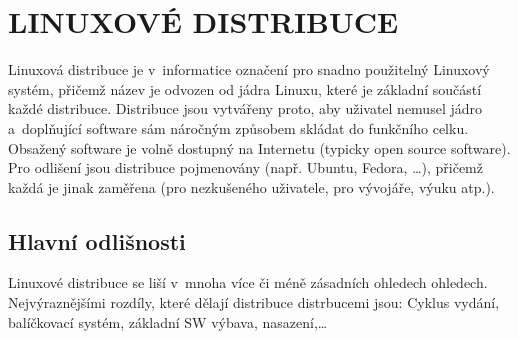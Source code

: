 \documentclass[a4paper,12pt]{article}
\newcommand{\sectionV}[1]{\section{\uppercase{#1}}}	%
\begin{document}
\sectionV{Linuxové distribuce}
Linuxová distribuce je v~informatice označení pro snadno použitelný Linuxový systém, přičemž název je odvozen od jádra Linuxu, které je základní součástí každé distribuce. Distribuce jsou vytvářeny proto, aby uživatel nemusel jádro a~doplňující software sám náročným způsobem skládat do funkčního celku. Obsažený software je volně dostupný na Internetu (typicky open source software). Pro odlišení jsou distribuce pojmenovány (např. Ubuntu, Fedora, …), přičemž každá je jinak zaměřena (pro nezkušeného uživatele, pro vývojáře, výuku atp.).\cite{WDIST}

\subsection{Hlavní odlišnosti}
Linuxové distribuce se liší v~mnoha více či méně zásadních ohledech ohledech. Nejvýraznějšími rozdíly, které dělají distribuce distrbucemi jsou: Cyklus vydání, balíčkovací systém, základní SW výbava, nasazení,…
\end{document}

